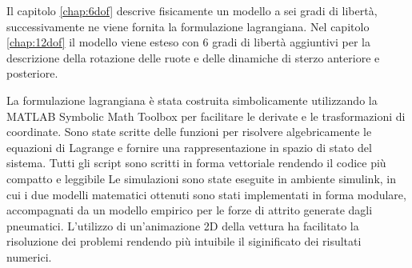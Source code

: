 Il capitolo \ref{chap:6dof} descrive fisicamente un modello a sei gradi di libertà, successivamente ne viene fornita la formulazione lagrangiana. Nel capitolo \ref{chap:12dof} il modello viene esteso con 6 gradi di libertà aggiuntivi per la descrizione della rotazione delle ruote e delle dinamiche di sterzo anteriore e posteriore.

La formulazione lagrangiana è stata costruita simbolicamente utilizzando la  MATLAB Symbolic Math Toolbox per facilitare le derivate e le trasformazioni di coordinate.
Sono state scritte delle funzioni per risolvere algebricamente le equazioni di Lagrange e fornire una rappresentazione in spazio di stato del sistema.
Tutti gli script sono scritti in forma vettoriale rendendo il codice più compatto e leggibile
Le simulazioni sono state eseguite in ambiente simulink, in cui i due modelli matematici ottenuti sono stati implementati in forma modulare, accompagnati da un modello empirico per le forze di attrito generate dagli pneumatici.
L'utilizzo di un'animazione 2D della vettura ha facilitato la risoluzione dei problemi rendendo più intuibile il siginificato dei risultati numerici.
